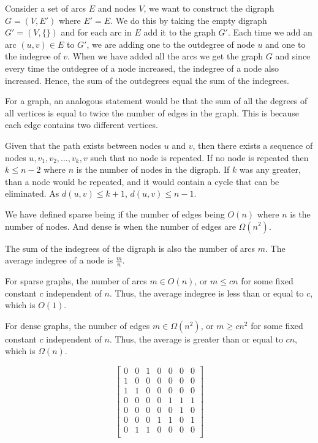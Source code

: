 
Consider a set of arcs \(E\) and
nodes \(V\), we want to construct the digraph \(G=(V,E')\) where
\(E'=E\). We do this by taking the empty digraph \(G'=(V,\{\})\)
and for each arc in \(E\) add it to the graph \(G'\). Each time we
add an arc \((u,v) \in E\) to \(G'\), we are adding one to the
outdegree of node \(u\) and one to the indegree of \(v\). When we
have added all the arcs we get the graph \(G\) and since every time
the outdegree of a node increased, the indegree of a node also
increased. Hence, the sum of the outdegrees equal the sum of the
indegrees.

For a graph, an analogous statement would be that the sum of all
the degrees of all vertices is equal to twice the number
of edges in the graph. This is because each edge contains two 
different vertices.

Given that the path exists between nodes \(u\) and \(v\), then there
exists a sequence of nodes \(u,v_1,v_2,\ldots,v_k,v\) such that no node is
repeated. If no node is repeated then \(k \leq n-2\) where \(n\)
is the number of nodes in the digraph. If \(k\) was any greater,
than a node would be repeated, and it would contain a cycle that can be
eliminated.  As \(d(u,v) \leq k+1\), \(d(u,v) \leq n-1\).

We have defined sparse being if the number of edges being \(O(n)\)
where \(n\) is the number of nodes. And dense is when the number
of edges are \(\Omega(n^2)\).

The sum of the indegrees of the digraph is
also the number of arcs $m$. The average indegree of
a node is \(\frac{m}{n}\).

For sparse graphs, the number of arcs  $m \in O(n)$, or $m \leq cn$ for
some fixed constant $c$ independent of $n$. Thus, the average indegree is less
than or equal to $c$, which is $O(1)$.

For dense graphs, the number of edges $m \in \Omega(n^2)$, or $m \geq
cn^2$ for some fixed constant $c$ independent of $n$.  Thus, the average 
is greater than or equal to $cn$, which is $\Omega(n)$.

\[\left[
	\begin{array}{ccccccc}
	0& 0& 1& 0& 0& 0& 0 \\
	1& 0& 0& 0& 0& 0& 0 \\
	1& 1& 0& 0& 0& 0& 0 \\
	0& 0& 0& 0& 1& 1& 1 \\
	0& 0& 0& 0& 0& 1& 0 \\
	0& 0& 0& 1& 1& 0& 1 \\
	0& 1& 1& 0& 0& 0& 0 \\
	\end{array}
\right]\]


